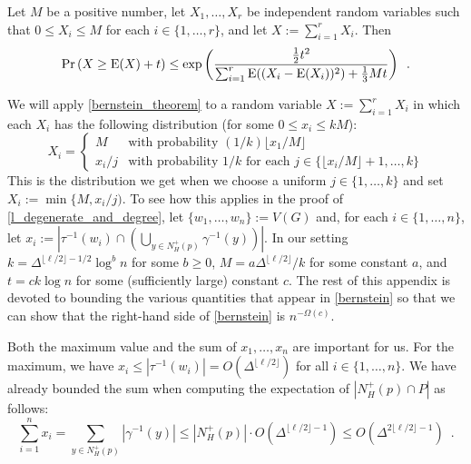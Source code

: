 \documentclass{patmorin}
\begin{document}
\begin{thm}\label{bernstein_theorem}
  Let $M$ be a positive number, let $X_1,\ldots,X_r$ be independent random variables such that $0\le X_i\le M$ for each $i\in\{1,\ldots,r\}$, and let $X:=\sum_{i=1}^r X_i$. Then
  \begin{equation}
    \Pr\left(X \ge \mathrm{E}(X)+ t\right)
      \le \exp\left(\frac{\tfrac{1}{2}t^2}{\sum_{i=1}^r \mathrm{E}((X_i-\mathrm{E}(X_i))^2)+\tfrac{1}{3}Mt}\right) \enspace . \label{bernstein}
  \end{equation}
\end{thm}
We will apply \cref{bernstein_theorem} to a random variable $X:=\sum_{i=1}^r X_i$ in which each $X_i$ has the following distribution (for some $0\le x_i\le kM$):
\[
  X_i = \begin{cases}
          M & \text{with probability $(1/k)\lfloor x_1/M\rfloor$} \\
          x_i/j & \text{with probability $1/k$ for each $j\in\{\lfloor x_i/M\rfloor+1,\ldots,k\}$}
        \end{cases}
\]
This is the distribution we get when we choose a uniform $j\in\{1,\ldots,k\}$ and set $X_i:=\min\{M,x_i/j)$.  To see how this applies in the proof of \cref{l_degenerate_and_degree}, let $\{w_1,\ldots,w_n\}:=V(G)$ and, for each $i\in\{1,\ldots,n\}$, let $x_i:=|\tau^{-1}(w_i)\cap\left(\bigcup_{y\in N^+_H(p)}\gamma^{-1}(y)\right)|$.  In our setting $k=\Delta^{\lfloor\ell/2\rfloor-1/2}\log^b n$ for some $b\ge 0$,  $M=a\Delta^{\lfloor\ell/2\rfloor}/k$ for some constant $a$, and $t=ck\log n$ for some (sufficiently large) constant $c$.  The rest of this appendix is devoted to bounding the various quantities that appear in \cref{bernstein} so that we can show that the right-hand side of \cref{bernstein} is $n^{-\Omega(c)}$.

Both the maximum value and the sum of $x_1,\ldots,x_n$ are important for us. For the maximum, we have $x_i\le|\tau^{-1}(w_i)|= O(\Delta^{\lfloor\ell/2\rfloor})$ for all $i\in\{1,\ldots,n\}$.  We have already bounded the sum when computing the expectation of $|N_H^+(p)\cap P|$ as follows:
\[
  \sum_{i=1}^n x_i = \sum_{y\in N^+_H(p)} |\gamma^{-1}(y)|
  \le |N^+_H(p)|\cdot O(\Delta^{\lfloor\ell/2\rfloor-1})
  \le O(\Delta^{2\lfloor\ell/2\rfloor-1}) \enspace .
\]
\end{document}
